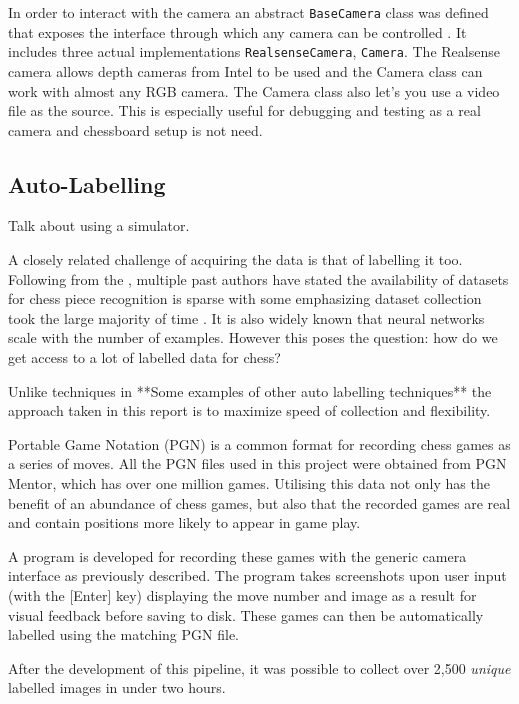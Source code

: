 In order to interact with the camera an abstract \verb|BaseCamera| class was defined that 
exposes the interface through which any camera can be controlled \cite{}.  It includes three 
actual implementations \verb|RealsenseCamera|, \verb|Camera|.  The Realsense camera allows 
depth cameras from Intel to be used and the Camera class can work with almost any RGB camera.
The Camera class also let's you use a video file as the source.  This is especially useful for 
debugging and testing as a real camera and chessboard setup is not need.

\subsection{Auto-Labelling}
Talk about using a simulator.

A closely related challenge of acquiring the data is that of labelling it too. 
Following from the , multiple past authors have stated the availability of 
datasets for chess piece recognition is sparse \cite{Ding2016ChessVisionC, heatmap} with some emphasizing
dataset collection took the large majority of time \cite{chessvgg}.
It is also widely known that neural networks scale with the number of examples.
However this poses the question: how do we get access to a lot of labelled data 
for chess?

Unlike techniques in \cite{}  **Some examples of other auto labelling techniques**
the approach taken in this report is to maximize speed of collection and flexibility.

Portable Game Notation (PGN) is a common format for recording chess games as a 
series of moves.  All the PGN files used in this 
project were obtained from PGN Mentor, which has over one million games.  Utilising this
data not only has the benefit of an abundance of chess games, but also that the 
recorded games are real and contain positions more likely to appear in game play. 

A program is developed for recording these games with the generic camera interface
as previously described.  The program takes screenshots upon user input (with the
[Enter] key) displaying the move number and image as a result for visual feedback
before saving to disk.  These games can then be automatically labelled using the matching
PGN file.

After the development of this pipeline, it was possible to collect over 2,500 \textit{unique} labelled
images in under two hours.

